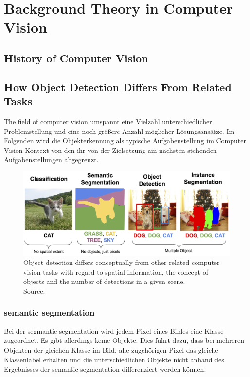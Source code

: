 \documentclass[
			   fontsize=11pt,
               paper=a4,
               bibliography=totoc,
               idxtotoc,
               headsepline,
               footsepline,
               footinclude=false,
               BCOR=12mm,
               DIV=13,
               openany,   %
               ]
               {scrbook}
\begin{document}
\chapter{Background Theory in Computer Vision}

\section{History of Computer Vision}


\section{How Object Detection Differs From Related Tasks}

The field of computer vision umspannt eine Vielzahl unterschiedlicher Problemstellung und eine noch größere Anzahl möglicher Lösungsansätze. Im Folgenden wird die Objekterkennung als typische Aufgabenstellung im Computer Vision Kontext von den ihr von der Zielsetzung am nächsten stehenden Aufgabenstellungen abgegrenzt.

\begin{figure}[H] %
	\centering
	\includegraphics[width=\textwidth]{figures/detection_related_tasks.png}
	\caption[Typical Computer Vision Tasks]{Object detection differs conceptually from other related computer vision tasks with regard to spatial information, the concept of objects and the number of detections in a given scene.\\
		\tiny{Source:~\cite{cvTasks}}}
	\label{fig:cvTasks} %
\end{figure}

\subsection{semantic segmentation}
Bei der segmantic segmentation wird jedem Pixel eines Bildes eine Klasse zugeordnet. Es gibt allerdings keine Objekte. Dies führt dazu, dass bei mehreren Objekten der gleichen Klasse im Bild, alle zugehörigen Pixel das gleiche Klassenlabel erhalten und die unterschiedlichen Objekte nicht anhand des Ergebnisses der semantic segmentation differenziert werden können.
\end{document}

